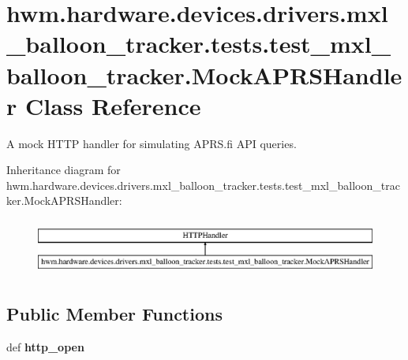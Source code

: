 \hypertarget{classhwm_1_1hardware_1_1devices_1_1drivers_1_1mxl__balloon__tracker_1_1tests_1_1test__mxl__ballo80cf737b8e85ab33d541a92bea4dd93c}{\section{hwm.\-hardware.\-devices.\-drivers.\-mxl\-\_\-balloon\-\_\-tracker.\-tests.\-test\-\_\-mxl\-\_\-balloon\-\_\-tracker.\-Mock\-A\-P\-R\-S\-Handler Class Reference}
\label{classhwm_1_1hardware_1_1devices_1_1drivers_1_1mxl__balloon__tracker_1_1tests_1_1test__mxl__ballo80cf737b8e85ab33d541a92bea4dd93c}
}


A mock H\-T\-T\-P handler for simulating A\-P\-R\-S.\-fi A\-P\-I queries.  


Inheritance diagram for hwm.\-hardware.\-devices.\-drivers.\-mxl\-\_\-balloon\-\_\-tracker.\-tests.\-test\-\_\-mxl\-\_\-balloon\-\_\-tracker.\-Mock\-A\-P\-R\-S\-Handler\-:\begin{figure}[H]
\begin{center}
\leavevmode
\includegraphics[height=1.876047cm]{classhwm_1_1hardware_1_1devices_1_1drivers_1_1mxl__balloon__tracker_1_1tests_1_1test__mxl__ballo80cf737b8e85ab33d541a92bea4dd93c}
\end{center}
\end{figure}
\subsection*{Public Member Functions}
\begin{DoxyCompactItemize}
\item 
\hypertarget{classhwm_1_1hardware_1_1devices_1_1drivers_1_1mxl__balloon__tracker_1_1tests_1_1test__mxl__ballo80cf737b8e85ab33d541a92bea4dd93c_aa930de19adafb872c6d9228d59af6187}{def {\bfseries http\-\_\-open}}\label{classhwm_1_1hardware_1_1devices_1_1drivers_1_1mxl__balloon__tracker_1_1tests_1_1test__mxl__ballo80cf737b8e85ab33d541a92bea4dd93c_aa930de19adafb872c6d9228d59af6187}

\end{DoxyCompactItemize}


